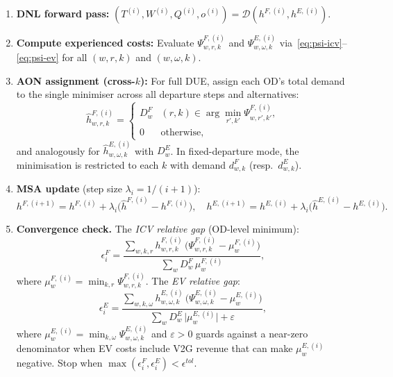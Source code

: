 \begin{enumerate}
  \item \textbf{DNL forward pass:}
    $(T^{(i)}, W^{(i)}, Q^{(i)}, o^{(i)})
    = \mathcal{D}(h^{F,(i)}, h^{E,(i)})$.
  \item \textbf{Compute experienced costs:}
    Evaluate $\Psi^{F,(i)}_{w,r,k}$ and $\Psi^{E,(i)}_{w,\omega,k}$
    via~\eqref{eq:psi-icv}--\eqref{eq:psi-ev} for all $(w,r,k)$ and
    $(w,\omega,k)$.
  \item \textbf{AON assignment (cross-$k$):}
    For full DUE, assign each OD's total demand to the single minimiser
    across all departure steps and alternatives:
    \begin{equation}
      \hat{h}^{F,(i)}_{w,r,k}
      = \begin{cases}
          D^F_w & (r,k) \in \arg\min_{r',k'} \Psi^{F,(i)}_{w,r',k'}, \\
          0     & \text{otherwise},
        \end{cases}
      \label{eq:msa-aon-icv}
    \end{equation}
    and analogously for $\hat{h}^{E,(i)}_{w,\omega,k}$ with $D^E_w$.
    In fixed-departure mode, the minimisation is restricted to each $k$
    with demand $d^F_{w,k}$ (resp.\ $d^E_{w,k}$).
  \item \textbf{MSA update} (step size $\lambda_i = 1/(i+1)$):
    \begin{equation}
      h^{F,(i+1)} = h^{F,(i)} + \lambda_i\bigl(\hat{h}^{F,(i)} - h^{F,(i)}\bigr),
      \quad
      h^{E,(i+1)} = h^{E,(i)} + \lambda_i\bigl(\hat{h}^{E,(i)} - h^{E,(i)}\bigr).
      \label{eq:msa-mixed-update}
    \end{equation}
  \item \textbf{Convergence check.}
    The \emph{ICV relative gap} (OD-level minimum):
    \begin{equation}
      \epsilon^F_i
      = \frac{
          \displaystyle\sum_{w,k,r}
            h^{F,(i)}_{w,r,k}\,
            \bigl(\Psi^{F,(i)}_{w,r,k} - \mu^{F,(i)}_w\bigr)
        }{
          \displaystyle\sum_w D^F_w\,\mu^{F,(i)}_w
        },
      \label{eq:icv-gap}
    \end{equation}
    where $\mu^{F,(i)}_w = \min_{k,r} \Psi^{F,(i)}_{w,r,k}$.
    The \emph{EV relative gap}:
    \begin{equation}
      \epsilon^E_i
      = \frac{
          \displaystyle\sum_{w,k,\omega}
            h^{E,(i)}_{w,\omega,k}\,
            \bigl(\Psi^{E,(i)}_{w,\omega,k} - \mu^{E,(i)}_w\bigr)
        }{
          \displaystyle\sum_w D^E_w\,\bigl|\mu^{E,(i)}_w\bigr| + \varepsilon
        },
      \label{eq:ev-gap}
    \end{equation}
    where $\mu^{E,(i)}_w = \min_{k,\omega} \Psi^{E,(i)}_{w,\omega,k}$
    and $\varepsilon > 0$ guards against a near-zero denominator when
    EV costs include V2G revenue that can make $\mu^{E,(i)}_w$ negative.
    Stop when $\max(\epsilon^F_i, \epsilon^E_i) < \epsilon^{tol}$.
\end{enumerate}

